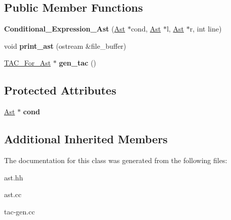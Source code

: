 \subsection*{Public Member Functions}
\begin{DoxyCompactItemize}
\item 
\mbox{\label{classConditional__Expression__Ast_aa6b12af384f8de1ac623289f1a00456c}} 
{\bfseries Conditional\+\_\+\+Expression\+\_\+\+Ast} (\hyperlink{classAst}{Ast} $\ast$cond, \hyperlink{classAst}{Ast} $\ast$l, \hyperlink{classAst}{Ast} $\ast$r, int line)
\item 
\mbox{\label{classConditional__Expression__Ast_abc60e586a729c80b6ec05f01eac5766f}} 
void {\bfseries print\+\_\+ast} (ostream \&file\+\_\+buffer)
\item 
\mbox{\label{classConditional__Expression__Ast_afae8029a346410e02f29be9064080d72}} 
\hyperlink{classTAC__For__Ast}{T\+A\+C\+\_\+\+For\+\_\+\+Ast} $\ast$ {\bfseries gen\+\_\+tac} ()
\end{DoxyCompactItemize}
\subsection*{Protected Attributes}
\begin{DoxyCompactItemize}
\item 
\mbox{\label{classConditional__Expression__Ast_afd90dd444308073ed4f801f3e67e5f08}} 
\hyperlink{classAst}{Ast} $\ast$ {\bfseries cond}
\end{DoxyCompactItemize}
\subsection*{Additional Inherited Members}


The documentation for this class was generated from the following files\+:\begin{DoxyCompactItemize}
\item 
ast.\+hh\item 
ast.\+cc\item 
tac-\/gen.\+cc\end{DoxyCompactItemize}
